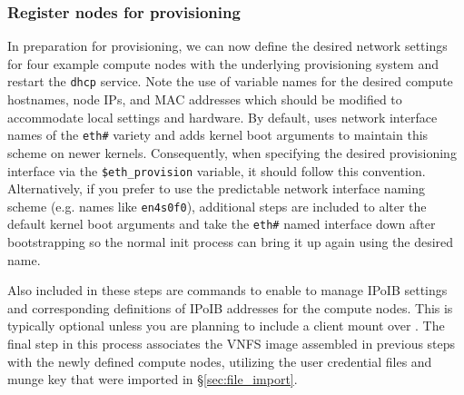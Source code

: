 \subsubsection{Register nodes for provisioning}

In preparation for provisioning, we can now define the desired network settings
for four example compute nodes with the underlying provisioning system and
restart the \texttt{dhcp} service. Note the use of variable names for the
desired compute hostnames, node IPs, and MAC addresses which should be modified
to accommodate local settings and hardware.  By default, \Warewulf{} uses
network interface names of the \texttt{eth\#} variety and adds kernel boot
arguments to maintain this scheme on newer kernels. Consequently, when specifying
the desired provisioning interface via the \texttt{\$eth\_provision} variable,
it should follow this convention. Alternatively, if you prefer to use the
predictable network interface naming scheme (e.g. names like \texttt{en4s0f0}),
additional steps are included to alter the default kernel boot arguments and take
the \texttt{eth\#} named interface down after bootstrapping so the normal init
process can bring it up again using the desired name.

Also included in these steps are commands
to enable \Warewulf{} to manage IPoIB settings and corresponding definitions of
IPoIB addresses for the compute nodes. This is typically optional unless you
are planning to include a \Lustre{} client mount over \InfiniBand{}. The final step
in this process associates the VNFS image assembled in previous steps with the
newly defined compute nodes, utilizing the user credential files and munge key
that were imported in \S\ref{sec:file_import}.


